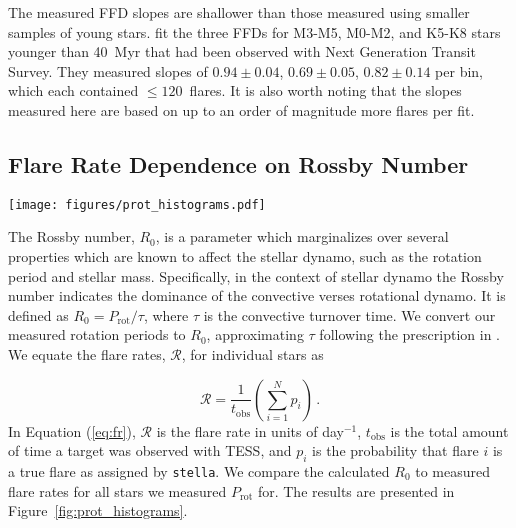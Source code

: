 \documentclass[twocolumn]{aastex631}
\begin{document}
The measured FFD slopes are shallower than those measured using smaller samples of young stars. \cite{jackman21} fit the three FFDs for M3-M5, M0-M2, and K5-K8 stars younger than 40~Myr that had been observed with Next Generation Transit Survey. They measured slopes of $0.94 \pm 0.04$, $0.69 \pm 0.05$, $0.82 \pm 0.14$ per bin, which each contained $\leq 120$~flares.  It is also worth noting that the slopes measured here are based on up to an order of magnitude more flares per fit.



\subsection{Flare Rate Dependence on Rossby Number}\label{subsec:rossby}

\begin{figure*}[htb!]
    \begin{centering}
        \texttt{[image: figures/prot\_histograms.pdf]}
        \caption{
            Comparison of Rossby Number, $R_0$ and flare rate for young GKM stars.
            We find no change in the average flare rate for GKM stars $< 250$\,Myr.
            We see evidence that as $R_0$ increases, the average flare rate decreases.
            This is similar to results presented in \cite{medina20}, however our sample extends this
            trend to young GKM stars, while previous results were limited to nearby M dwarfs. The top row are
            stars with ages $4.5 - 50$\,Myr; the bottom row are stars with ages $50 - 250$\,Myr. The
            histograms are colored by number of stars in each bin.
        }
        \label{fig:prot_histograms}
    \end{centering}
\end{figure*}

The Rossby number, $R_0$, is a parameter which marginalizes over several properties which are known to affect the stellar dynamo, such as the rotation period and stellar mass. Specifically, in the context of stellar dynamo the Rossby number indicates the dominance of the convective verses rotational dynamo. It is defined as $R_0 = P_\textrm{rot}/\tau$, where $\tau$ is the convective turnover time. We convert our measured rotation periods to $R_0$,  approximating $\tau$ following the prescription in \cite{wright11}. We
equate the flare rates, $\mathcal{R}$, for individual stars as

\begin{equation}\label{eq:fr}
  \mathcal{R} = \frac{1}{t_\textrm{obs}} \left( \sum_{i=1}^{N} p_i \right)\,.
\end{equation}
In Equation (\ref{eq:fr}), $\mathcal{R}$ is the flare rate in units of day$^{-1}$, $t_\textrm{obs}$ is the total amount of time a target was observed with TESS, and $p_i$ is the probability that flare $i$ is a true flare as assigned by \texttt{stella}.
We compare the calculated $R_0$ to measured flare rates for all stars we measured $P_\textrm{rot}$ for. The results are presented in Figure~\ref{fig:prot_histograms}.
\end{document}
